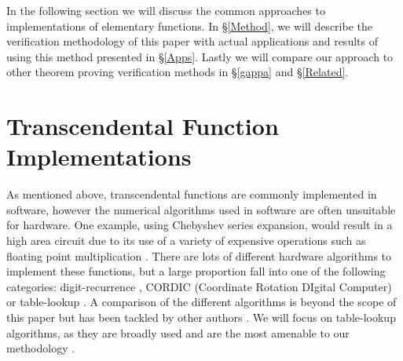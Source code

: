 \documentclass{fac}
\begin{document}
In the following section we will discuss the common approaches to implementations of elementary functions. In \S \ref{Method}, we will describe the verification methodology of this paper with actual applications and results of using this method presented in \S \ref{Apps}. Lastly we will compare our approach to other theorem proving verification methods in \S \ref{gappa} and \S \ref{Related}.


\section{Transcendental Function Implementations}
\label{trans functs}

As mentioned above, transcendental functions are commonly implemented in software, however the numerical algorithms used in software are often unsuitable for hardware. One example, using Chebyshev series expansion, would result in a high area circuit due to its use of a variety of expensive operations such as floating point multiplication \cite{fowkes1993hardware}. There are lots of different hardware algorithms to implement these functions, but a large proportion fall into one of the following categories: digit-recurrence \cite{bajard1994bkm,1030708}, CORDIC  (Coordinate Rotation DIgital Computer) \cite{volder1959cordic,andraka1998survey,10.1145/1478786.1478840} or table-lookup \cite{tang1991table,story1999new}. A comparison of the different algorithms is beyond the scope of this paper but has been tackled by other authors \cite{tang1991table,pineiro2004algorithm}. We will focus on table-lookup algorithms, as they are broadly used and are the most amenable to our methodology .
\end{document}

